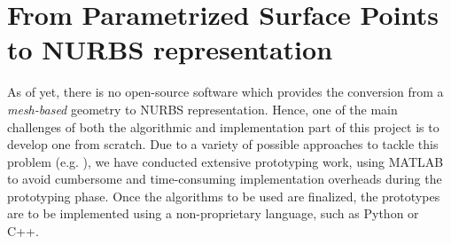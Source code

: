 \section{From Parametrized Surface Points to NURBS representation}
As of yet, there is no open-source software which provides the conversion from a \textit{mesh-based} geometry to NURBS representation. Hence, one of the main challenges of both the algorithmic and implementation part of this project is to develop one from scratch. Due to a variety of possible approaches to tackle this problem (e.g. \cite{ eck1996automatic, becker2011advanced}), we have conducted extensive prototyping work, using MATLAB \cite{MATLAB} to avoid cumbersome and time-consuming implementation overheads during the prototyping phase. Once the algorithms to be used are finalized, the prototypes are to be implemented using a non-proprietary language, such as Python or C++.

%

